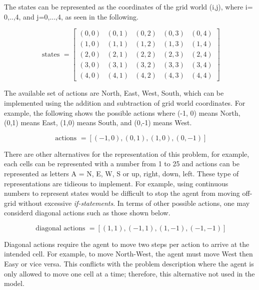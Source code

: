 \documentclass[11pt]{article}
\begin{document}
\noindent
The states can be represented as the coordinates of the grid world (i,j), where i=
0,..,4, and j=0,...,4, as seen in the following.

\begin{equation}
\text { states }=\left[\begin{array}{lllll}
{(0,0)} & {(0,1)} & {(0,2)} & {(0,3)} & {(0,4)} \\
{(1,0)} & {(1,1)} & {(1,2)} & {(1,3)} & {(1,4)} \\
{(2,0)} & {(2,1)} & {(2,2)} & {(2,3)} & {(2,4)} \\
{(3,0)} & {(3,1)} & {(3,2)} & {(3,3)} & {(3,4)} \\
{(4,0)} & {(4,1)} & {(4,2)} & {(4,3)} & {(4,4)}
\end{array}\right]
\end{equation}


\noindent
The available set of actions are North, East, West, South, which can be implemented
using the addition and subtraction of grid world coordinates. For example, the following
shows the possible actions where (-1, 0) means North, (0,1) means East, (1,0) means South,
and (0,-1) means West.

\begin{equation}
\text { actions }=[(-1,0),(0,1),(1,0),(0,-1)]
\end{equation}

\noindent
There are other alternatives for the representation of this problem, for
example, each cells can be represented with a number from 1 to 25 and actions
can be represented as letters A = {N, E, W, S} or {up, right, down, left}. These
type of representations are tidieous to implement. For example, using continuous
numbers to represent states would be difficult to stop the agent from moving
off-grid without excessive \textit{if-statements}. In terms of other possible
actions, one may considerd diagonal actions such as those shown below.

\begin{equation}
\text { diagonal actions }=[(1,1),(-1,1),(1,-1),(-1,-1)]
\end{equation}

\noindent
Diagonal actions require the agent to move two steps per action to arrive at the
intended cell. For example, to move North-West, the agent must move West then
Easy or vice versa. This conflicts with the problem description where the agent
is only allowed to move one cell at a time; therefore, this alternative  not
used in the model. \\
\end{document}
